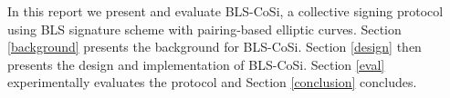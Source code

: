In this report we present and evaluate BLS-CoSi, a collective signing protocol using BLS signature scheme with pairing-based elliptic curves. Section \ref{background} presents the background for BLS-CoSi. Section \ref{design} then presents the design and implementation of BLS-CoSi. Section \ref{eval} experimentally evaluates the protocol and Section \ref{conclusion} concludes.
\clearpage
